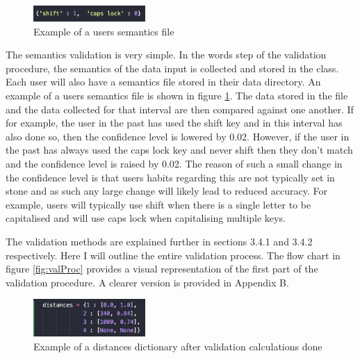 \documentclass[10pt,a4paper]{report}
\begin{document}
\begin{figure}
	\begin{center}
		\includegraphics[width=0.38\textwidth]{SemanticsEx}
	\end{center}
	\caption{Example of a users semantics file}
	\label{fig:sem}
\end{figure}

The semantics validation is very simple. In the words step of the validation procedure, the semantics of the data input is collected and stored in the class. Each user will also have a semantics file stored in their data directory. An example of a users semantics file is shown in figure \ref{fig:sem}. The data stored in the file and the data collected for that interval are then compared against one another. If for example, the user in the past has used the shift key and in this interval has also done so, then the confidence level is lowered by 0.02. However, if the user in the past has always used the caps lock key and never shift then they don't match and the confidence level is raised by 0.02. The reason of such a small change in the confidence level is that users habits regarding this are not typically set in stone and as such any large change will likely lead to reduced accuracy. For example, users will typically use shift when there is a single letter to be capitalised and will use caps lock when capitalising multiple keys. 

The validation methods are explained further in sections 3.4.1 and 3.4.2 respectively. Here I will outline the entire validation process. The flow chart in figure \ref{fig:valProc} provides a visual representation of the first part of the validation procedure. A clearer version is provided in Appendix B.

\begin{figure}
	\begin{center}
		\includegraphics[width=0.38\textwidth]{DistancesDict}
	\end{center}
	\caption{Example of a distances dictionary after validation calculations done}
	\label{fig:distances}
\end{figure}
\end{document}
